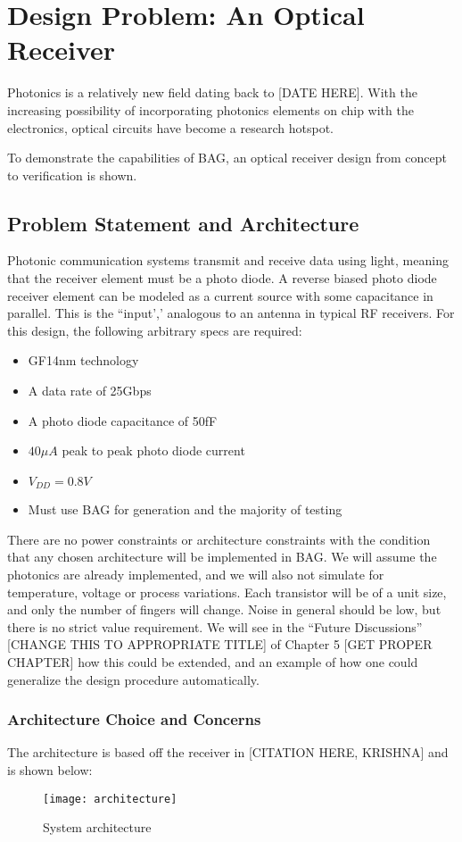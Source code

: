 \chapter{Design Problem: An Optical Receiver}

Photonics is a relatively new field dating back to [DATE HERE]. With the increasing possibility of incorporating photonics elements on chip with the electronics, optical circuits have become a research hotspot. 

To demonstrate the capabilities of BAG, an optical receiver design from concept to verification is shown.

\section{Problem Statement and Architecture}
Photonic communication systems transmit and receive data using light, meaning that the receiver element must be a photo diode. A reverse biased photo diode receiver element can be modeled as a current source with some capacitance in parallel. This is the ``input',' analogous to an antenna in typical RF receivers. For this design, the following arbitrary specs are required:
\begin{itemize}
\item GF14nm technology
\item A data rate of 25Gbps
\item A photo diode capacitance of 50fF
\item $40\mu A$ peak to peak photo diode current
\item $V_{DD}=0.8V$
\item Must use BAG for generation and the majority of testing
\end{itemize}

There are no power constraints or architecture constraints with the condition that any chosen architecture will be implemented in BAG. We will assume the photonics are already implemented, and we will also not simulate for temperature, voltage or process variations. Each transistor will be of a unit size, and only the number of fingers will change. Noise in general should be low, but there is no strict value requirement. We will see in the ``Future Discussions'' [CHANGE THIS TO APPROPRIATE TITLE] of Chapter 5 [GET PROPER CHAPTER] how this could be extended, and an example of how one could generalize the design procedure automatically.

\subsection{Architecture Choice and Concerns}
The architecture is based off the receiver in [CITATION HERE, KRISHNA] and is shown below:
\begin{figure}[h]
\centering
\texttt{[image: architecture]}
\caption{System architecture}
\label{fig:System Architecture}
\end{figure}

